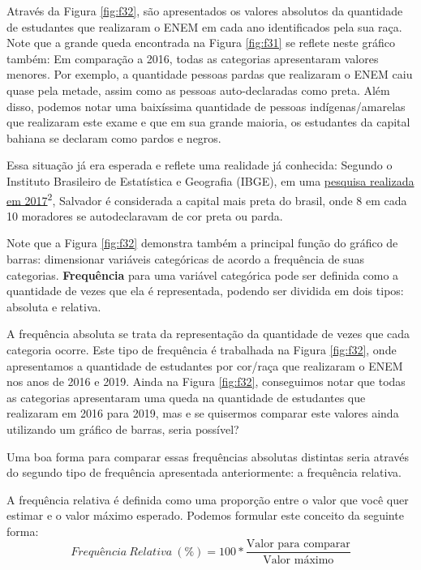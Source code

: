 \documentclass[
  portuguese,
  oneside]{book}
\begin{document}
Através da Figura \ref{fig:f32}, são apresentados os valores absolutos da quantidade de estudantes que realizaram o ENEM em cada ano identificados pela sua raça. Note que a grande queda encontrada na Figura \ref{fig:f31} se reflete neste gráfico também: Em comparação a 2016, todas as categorias apresentaram valores menores. Por exemplo, a quantidade pessoas pardas que realizaram o ENEM caiu quase pela metade, assim como as pessoas auto-declaradas como preta. Além disso, podemos notar uma baixíssima quantidade de pessoas indígenas/amarelas que realizaram este exame e que em sua grande maioria, os estudantes da capital bahiana se declaram como pardos e negros.

Essa situação já era esperada e reflete uma realidade já conhecida: Segundo o Instituto Brasileiro de Estatística e Geografia (IBGE), em uma \href{https://www.acordacidade.com.br/noticias/203087/ibge-ba-salvador-a-capital-mais-negra-do-brasil-e-com-a-maior-desigualdade-salarial-entre-brancos-e-pretos.html?mobile=true}{pesquisa realizada em 2017}\textsuperscript{2}, Salvador é considerada a capital mais preta do brasil, onde 8 em cada 10 moradores se autodeclaravam de cor preta ou parda.

Note que a Figura \ref{fig:f32} demonstra também a principal função do gráfico de barras: dimensionar variáveis categóricas de acordo a frequência de suas categorias. \textbf{Frequência} para uma variável categórica pode ser definida como a quantidade de vezes que ela é representada, podendo ser dividida em dois tipos: absoluta e relativa.

A frequência absoluta se trata da representação da quantidade de vezes que cada categoria ocorre. Este tipo de frequência é trabalhada na Figura \ref{fig:f32}, onde apresentamos a quantidade de estudantes por cor/raça que realizaram o ENEM nos anos de 2016 e 2019. Ainda na Figura \ref{fig:f32}, conseguimos notar que todas as categorias apresentaram uma queda na quantidade de estudantes que realizaram em 2016 para 2019, mas e se quisermos comparar este valores ainda utilizando um gráfico de barras, seria possível?

Uma boa forma para comparar essas frequências absolutas distintas seria através do segundo tipo de frequência apresentada anteriormente: a frequência relativa.

A frequência relativa é definida como uma proporção entre o valor que você quer estimar e o valor máximo esperado. Podemos formular este conceito da seguinte forma:
\[Frequência\ Relativa\ (\%) = 100*\frac{\text{Valor para comparar}}{\text{Valor máximo}}\]
\end{document}
